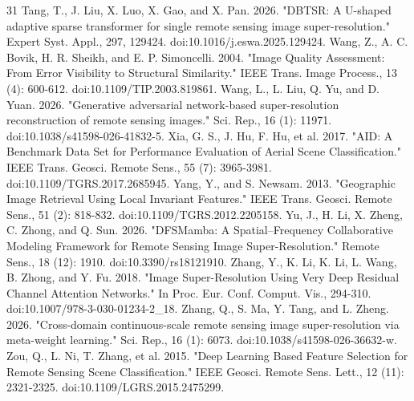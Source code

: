\documentclass{interact}
\begin{document}
\begin{thebibliography}{31}
Tang, T., J. Liu, X. Luo, X. Gao, and X. Pan. 2026. "DBTSR: A U-shaped adaptive sparse transformer for single remote sensing image super-resolution." Expert Syst. Appl., 297, 129424. doi:10.1016/j.eswa.2025.129424.
Wang, Z., A. C. Bovik, H. R. Sheikh, and E. P. Simoncelli. 2004. "Image Quality Assessment: From Error Visibility to Structural Similarity." IEEE Trans. Image Process., 13 (4): 600-612. doi:10.1109/TIP.2003.819861.
Wang, L., L. Liu, Q. Yu, and D. Yuan. 2026. "Generative adversarial network-based super-resolution reconstruction of remote sensing images." Sci. Rep., 16 (1): 11971. doi:10.1038/s41598-026-41832-5.
Xia, G. S., J. Hu, F. Hu, et al. 2017. "AID: A Benchmark Data Set for Performance Evaluation of Aerial Scene Classification." IEEE Trans. Geosci. Remote Sens., 55 (7): 3965-3981. doi:10.1109/TGRS.2017.2685945.
Yang, Y., and S. Newsam. 2013. "Geographic Image Retrieval Using Local Invariant Features." IEEE Trans. Geosci. Remote Sens., 51 (2): 818-832. doi:10.1109/TGRS.2012.2205158.
Yu, J., H. Li, X. Zheng, C. Zhong, and Q. Sun. 2026. "DFSMamba: A Spatial--Frequency Collaborative Modeling Framework for Remote Sensing Image Super-Resolution." Remote Sens., 18 (12): 1910. doi:10.3390/rs18121910.
Zhang, Y., K. Li, K. Li, L. Wang, B. Zhong, and Y. Fu. 2018. "Image Super-Resolution Using Very Deep Residual Channel Attention Networks." In Proc. Eur. Conf. Comput. Vis., 294-310. doi:10.1007/978-3-030-01234-2\_18.
Zhang, Q., S. Ma, Y. Tang, and L. Zheng. 2026. "Cross-domain continuous-scale remote sensing image super-resolution via meta-weight learning." Sci. Rep., 16 (1): 6073. doi:10.1038/s41598-026-36632-w.
Zou, Q., L. Ni, T. Zhang, et al. 2015. "Deep Learning Based Feature Selection for Remote Sensing Scene Classification." IEEE Geosci. Remote Sens. Lett., 12 (11): 2321-2325. doi:10.1109/LGRS.2015.2475299.
\end{thebibliography}
\end{document}
